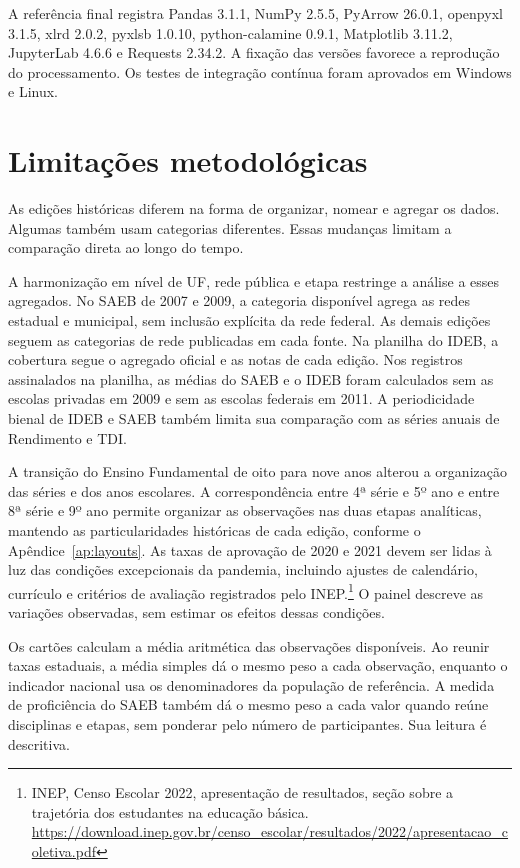 A referência final registra Pandas 3.1.1, NumPy 2.5.5, PyArrow 26.0.1, openpyxl 3.1.5, xlrd 2.0.2, pyxlsb 1.0.10, python-calamine 0.9.1, Matplotlib 3.11.2, JupyterLab 4.6.6 e Requests 2.34.2. A fixação das versões favorece a reprodução do processamento. Os testes de integração contínua foram aprovados em Windows e Linux.

\section{Limitações metodológicas}
\label{sec:limitacoes-metodologicas}

As edições históricas diferem na forma de organizar, nomear e agregar os dados. Algumas também usam categorias diferentes. Essas mudanças limitam a comparação direta ao longo do tempo.

A harmonização em nível de UF, rede pública e etapa restringe a análise a esses agregados. No SAEB de 2007 e 2009, a categoria disponível agrega as redes estadual e municipal, sem inclusão explícita da rede federal. As demais edições seguem as categorias de rede publicadas em cada fonte. Na planilha do IDEB, a cobertura segue o agregado oficial e as notas de cada edição. Nos registros assinalados na planilha, as médias do SAEB e o IDEB foram calculados sem as escolas privadas em 2009 e sem as escolas federais em 2011. A periodicidade bienal de IDEB e SAEB também limita sua comparação com as séries anuais de Rendimento e TDI.

A transição do Ensino Fundamental de oito para nove anos alterou a organização das séries e dos anos escolares. A correspondência entre 4ª série e 5º ano e entre 8ª série e 9º ano permite organizar as observações nas duas etapas analíticas, mantendo as particularidades históricas de cada edição, conforme o Apêndice~\ref{ap:layouts}. As taxas de aprovação de 2020 e 2021 devem ser lidas à luz das condições excepcionais da pandemia, incluindo ajustes de calendário, currículo e critérios de avaliação registrados pelo INEP.\footnote{INEP, Censo Escolar 2022, apresentação de resultados, seção sobre a trajetória dos estudantes na educação básica. \url{https://download.inep.gov.br/censo_escolar/resultados/2022/apresentacao_coletiva.pdf}} O painel descreve as variações observadas, sem estimar os efeitos dessas condições.

Os cartões calculam a média aritmética das observações disponíveis. Ao reunir taxas estaduais, a média simples dá o mesmo peso a cada observação, enquanto o indicador nacional usa os denominadores da população de referência. A medida de proficiência do SAEB também dá o mesmo peso a cada valor quando reúne disciplinas e etapas, sem ponderar pelo número de participantes. Sua leitura é descritiva.


